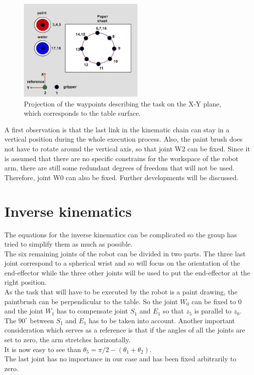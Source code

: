 \begin{figure}[!ht]
	\centering
    \includegraphics[width = 0.55\textwidth]{Images/Task_final}
    \caption{Projection of the waypoints describing the task on the X-Y plane, which corresponds to the table surface.}
    \label{fig:Task}
\end{figure}

\bigskip
\noindent A first observation is that the last link in the kinematic chain can stay in a vertical position during the whole execution process. Also, the paint brush does not have to rotate around the vertical axis, so that joint W2 can be fixed. Since it is assumed that there are no specific constrains for the workspace of the robot arm, there are still some redundant degrees of freedom that will not be used. Therefore, joint W0 can also be fixed. Further developments will be discussed.


\section{Inverse kinematics}
\label{sec: inv}
The equations for the inverse kinematics can be complicated so the group has tried to simplify them as much as possible.\\
The six remaining joints of the robot can be divided in two parts. The three last joint correspond to a spherical wrist and so will focus on the orientation of the end-effector while the three other joints will be used to put the end-effector at the right position.\\

\noindent As the task that will have to be executed by the robot is a paint drawing, the paintbrush can be perpendicular to the table. So the joint $W_0$ can be fixed to 0 and the joint $W_1$ has to compensate joint $S_1$ and $E_1$ so that $z_5$ is parallel to $z_0$. The $90^{\circ}$ between $S_1$ and $E_1$ has to be taken into account. Another important consideration which serves as a reference is that if the angles of all the joints are set to zero, the arm stretches horizontally.\\
It is now easy to see than $\theta_5 = \pi /2 - (\theta_1 + \theta_2)$. \\
The last joint has no importance in our case and has been fixed arbitrarily to zero.\\

